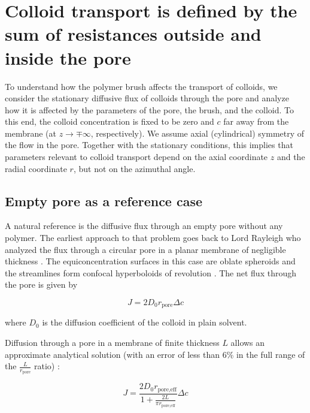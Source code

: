 \documentclass[12pt, a4paper]{article}
\begin{document}
\section{Colloid transport is defined by the sum of resistances outside and inside the pore}

To understand how the polymer brush affects the transport of colloids, we consider the stationary diffusive flux of colloids through the pore 
and analyze how it is affected by the parameters of the pore, the brush, and the colloid.
To this end, the colloid concentration is fixed to be zero and $c$ far away from the membrane (at $z\rightarrow\mp\infty$, respectively). 
We assume axial (cylindrical) symmetry of the flow in the pore. Together with the stationary conditions, 
this implies that parameters relevant to colloid transport depend on the axial coordinate $z$ and the radial coordinate $r$, but not on the azimuthal angle.

\subsection{Empty pore as a reference case}

A natural reference is the diffusive flux through an empty pore without any polymer. The earliest approach to that problem goes back to Lord Rayleigh 
who analyzed the flux through a circular pore in a planar membrane of negligible thickness \cite{Strutt1878}. 
The equiconcentration surfaces in this case are oblate spheroids and the streamlines form confocal hyperboloids of revolution \cite{Cooke1966}.
The net flux through the pore is given by

\begin{equation}
    J=2D_0r_{\text{pore}}\Delta c
    \label{eq:flux_Ral}
\end{equation}

\noindent where $D_0$ is the diffusion coefficient of the colloid in plain solvent. 

Diffusion through a pore in a membrane of finite thickness $L$ allows an approximate analytical solution (with an error of less than 6\% in the full range of the $\frac{L}{r_{\text{pore}}}$ ratio) \cite{Brunn1984}: 

\begin{equation}
    J=\frac{2D_0r_{\text{pore,eff}}}{1+\frac{2L}{\pi r_{\text{pore,eff}}}}\Delta c
    \label{eq:flux_finlength}
\end{equation}
\end{document}
